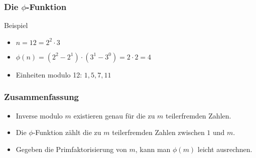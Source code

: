 \documentclass{beamer}
\renewcommand{\ae}{\"a}
\newcommand{\ue}{\"u}
\begin{document}
\begin{frame}\frametitle{Die $\phi$-Funktion}
	\begin{block}{Beispiel}
		\begin{itemize}
			\item $n=12=2^2\cdot 3$
			\item $\phi(n)=(2^2-2^1)\cdot(3^1-3^0)=2\cdot2=4$
			\item Einheiten modulo 12: $1,5,7,11$
		\end{itemize}
	\end{block}
\end{frame}

\begin{frame}\frametitle{Zusammenfassung}
	\begin{itemize}
		\item Inverse modulo $m$ existieren genau f\ue r die zu $m$ teilerfremden Zahlen.
		\item Die $\phi$-Funktion z\ae hlt die zu $m$ teilerfremden Zahlen zwischen $1$ und $m$.
		\item Gegeben die Primfaktorisierung von $m$, kann man $\phi(m)$ leicht ausrechnen.
	\end{itemize}
\end{frame}
\end{document}
